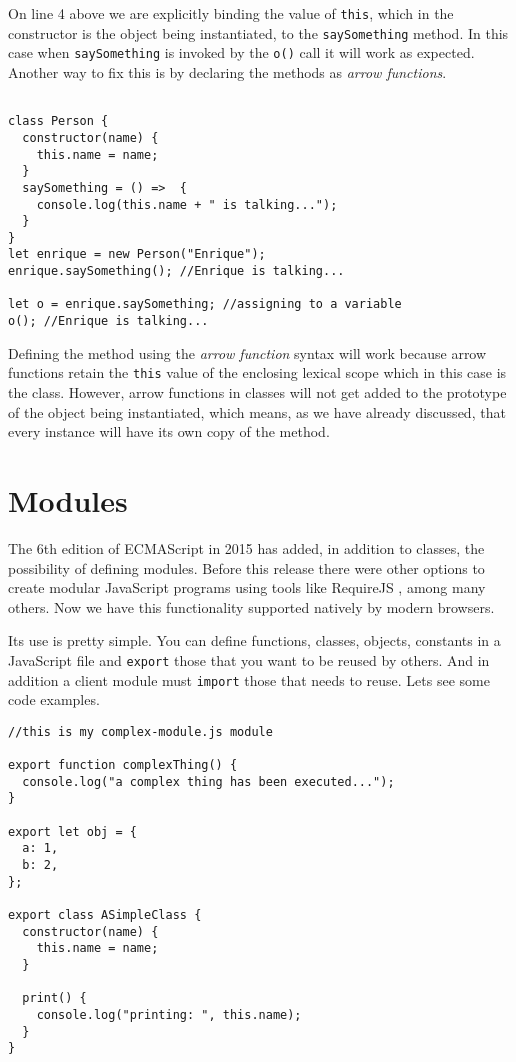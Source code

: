 \documentclass[a4paper, oneside, titlepage, 12pt]{book}
\begin{document}
On line 4 above we are explicitly binding the value of \texttt{this}, which in the constructor is the object being instantiated, to the \texttt{saySomething} method. In this case when \texttt{saySomething} is invoked by the \texttt{o()} call it will work as expected. Another way to fix this is by declaring the methods as \textit{arrow functions}.

\begin{verbatim}

class Person {
  constructor(name) {
    this.name = name;
  }
  saySomething = () =>  {
    console.log(this.name + " is talking...");
  }
}
let enrique = new Person("Enrique");
enrique.saySomething(); //Enrique is talking...

let o = enrique.saySomething; //assigning to a variable
o(); //Enrique is talking...
\end{verbatim}

Defining the method using the \textit{arrow function} syntax will work because arrow functions retain the \texttt{this} value of the enclosing lexical scope which in this case is the class. However, arrow functions in classes will not get added to the prototype of the object being instantiated, which means, as we have already discussed, that every instance will have its own copy of the method.

\section{Modules}
The 6th edition of ECMAScript in 2015 has added, in addition to classes, the possibility of defining modules. Before this release there were other options to create modular JavaScript programs using tools like RequireJS \cite{requirejs}, among many others. Now we have this functionality supported natively by modern browsers.

Its use is pretty simple. You can define functions, classes, objects, constants in a JavaScript file and \texttt{export} those that you want to be reused by others. And in addition a client module must \texttt{import} those that needs to reuse. Lets see some code examples.

\begin{verbatim}
//this is my complex-module.js module

export function complexThing() {
  console.log("a complex thing has been executed...");
}

export let obj = {
  a: 1,
  b: 2,
};

export class ASimpleClass {
  constructor(name) {
    this.name = name;
  }

  print() {
    console.log("printing: ", this.name);
  }
}
\end{verbatim}
\end{document}
